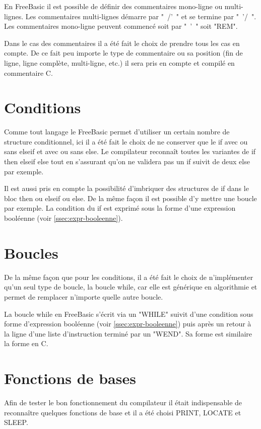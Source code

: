 \documentclass[french]{article}
\begin{document}
En FreeBasic il est possible de définir des commentaires mono-ligne ou multi-lignes. Les commentaires multi-lignes démarre par "~/'~" et se termine par "~'/~". Les commentaires mono-ligne peuvent commencé soit par "~'~" soit "REM".

Dans le cas des commentaires il a été fait le choix de prendre tous les cas en compte. De ce fait peu importe le type de commentaire ou sa position (fin de ligne, ligne complète, multi-ligne, etc.) il sera pris en compte et compilé en commentaire C.

\section{Conditions}

Comme tout langage le FreeBasic permet d'utiliser un certain nombre de structure conditionnel, ici il a été fait le choix de ne conserver que le if avec ou sans elseif et avec ou sans else. Le compilateur reconnaît toutes les variantes de if then elseif else tout en s'assurant qu'on ne validera pas un if suivit de deux else par exemple.

Il est aussi pris en compte la possibilité d'imbriquer des structures de if dans le bloc then ou elseif ou else. De la même façon il est possible d'y mettre une boucle par exemple. La condition du if est exprimé sous la forme d'une expression booléenne (voir \ref{ssec:expr-booleenne}).

\section{Boucles}

De la même façon que pour les conditions, il a été fait le choix de n'implémenter qu'un seul type de boucle, la boucle while, car elle est générique en algorithmie et permet de remplacer n'importe quelle autre boucle.

La boucle while en FreeBasic s'écrit via un "WHILE" suivit d'une condition sous forme d'expression booléenne (voir \ref{ssec:expr-booleenne}) puis après un retour à la ligne d'une liste d'instruction terminé par un "WEND". Sa forme est similaire la forme en C.

\section{Fonctions de bases}

Afin de tester le bon fonctionnement du compilateur il était indispensable de reconnaître quelques fonctions de base et il a été choisi PRINT, LOCATE et SLEEP.
\end{document}
